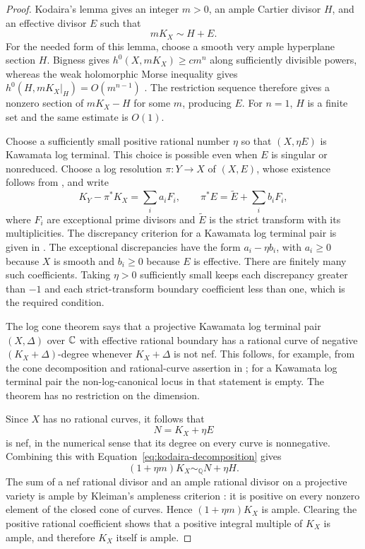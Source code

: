 \begin{proof}
Kodaira's lemma gives an integer $m>0$, an ample Cartier divisor $H$,
and an effective divisor $E$ such that
\begin{equation}
\label{eq:kodaira-decomposition}
 mK_X\sim H+E.
\end{equation}
For the needed form of this lemma, choose a smooth very ample
hyperplane section $H$. Bigness gives $h^0(X,mK_X)\ge cm^n$ along
sufficiently divisible powers, whereas the weak holomorphic Morse
inequality gives $h^0(H,mK_X|_H)=O(m^{n-1})$
\cite[Theorem~0.1(a)]{Demailly1985}. The restriction sequence therefore
gives a nonzero section of $mK_X-H$ for some $m$, producing $E$.
For $n=1$, $H$ is a finite set and the same estimate is $O(1)$.

Choose a sufficiently small positive rational number $\eta$ so that
$(X,\eta E)$ is Kawamata log terminal.  This choice is possible even
when $E$ is singular or nonreduced. Choose a log resolution
$\pi:Y\to X$ of $(X,E)$, whose existence follows from
\cite[Theorem~35]{Kollar2007}, and write
\[
 K_Y-\pi^*K_X=\sum_i a_iF_i,
 \qquad \pi^*E=\widetilde E+\sum_i b_iF_i,
\]
where $F_i$ are exceptional prime divisors and $\widetilde E$ is the
strict transform with its multiplicities. The discrepancy criterion
for a Kawamata log terminal pair is given in
\cite[\S4.4]{Fujino2011}. The exceptional discrepancies have the form
$a_i-\eta b_i$, with $a_i\ge0$ because $X$ is smooth and $b_i\ge0$
because $E$ is effective.  There are finitely many such coefficients.
Taking $\eta>0$ sufficiently small keeps each discrepancy greater
than $-1$ and each strict-transform boundary coefficient less than
one, which is the required condition.

The log cone theorem says that a projective Kawamata log terminal
pair $(X,\Delta)$ over $\mathbb C$ with effective rational boundary has a
rational curve of negative $(K_X+\Delta)$-degree whenever
$K_X+\Delta$ is not nef.  This follows, for example, from the cone
decomposition and rational-curve assertion in
\cite[Theorem~1.1, especially part~(5)]{Fujino2011}; for a Kawamata
log terminal pair the non-log-canonical locus in that statement is
empty.  The theorem has no restriction on the dimension.

Since $X$ has no rational curves, it follows that
\[
 N=K_X+\eta E
\]
is nef, in the numerical sense that its degree on every curve is
nonnegative. Combining this with Equation~\eqref{eq:kodaira-decomposition} gives
\[
 (1+\eta m)K_X\sim_{\mathbb Q}N+\eta H.
\]
The sum of a nef rational divisor and an ample rational divisor on a
projective variety is ample by Kleiman's ampleness criterion
\cite[Definition~4.9 and Theorem~4.10]{Fujino2011}: it is positive
on every nonzero element of the closed cone of curves. Hence
$(1+\eta m)K_X$ is ample. Clearing the
positive rational coefficient shows that a positive integral multiple
of $K_X$ is ample, and therefore $K_X$ itself is ample.
\end{proof}

